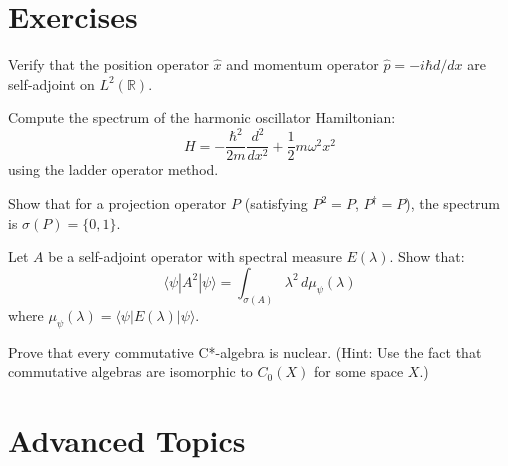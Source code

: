 \section{Exercises}

\begin{exercise}
Verify that the position operator $\hat{x}$ and momentum operator $\hat{p} = -i\hbar d/dx$ are self-adjoint on $L^2(\mathbb{R})$.
\end{exercise}

\begin{exercise}
Compute the spectrum of the harmonic oscillator Hamiltonian:
\begin{equation}
H = -\frac{\hbar^2}{2m}\frac{d^2}{dx^2} + \frac{1}{2}m\omega^2 x^2
\end{equation}
using the ladder operator method.
\end{exercise}

\begin{exercise}
Show that for a projection operator $P$ (satisfying $P^2 = P$, $P^\dagger = P$), the spectrum is $\sigma(P) = \{0, 1\}$.
\end{exercise}

\begin{exercise}
Let $A$ be a self-adjoint operator with spectral measure $E(\lambda)$. Show that:
\begin{equation}
\langle \psi | A^2 | \psi \rangle = \int_{\sigma(A)} \lambda^2 \, d\mu_\psi(\lambda)
\end{equation}
where $\mu_\psi(\lambda) = \langle \psi | E(\lambda) | \psi \rangle$.
\end{exercise}

\begin{exercise}
Prove that every commutative C*-algebra is nuclear. (Hint: Use the fact that commutative algebras are isomorphic to $C_0(X)$ for some space $X$.)
\end{exercise}

\section{Advanced Topics}

